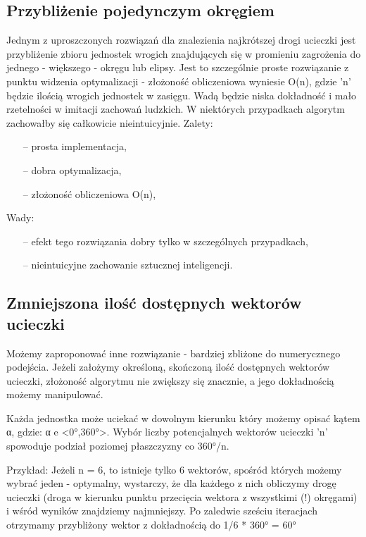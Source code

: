 \documentclass[12pt]{report}
\begin{document}
\subsection{Przybliżenie pojedynczym okręgiem}
Jednym z uproszczonych rozwiązań dla znalezienia najkrótszej drogi ucieczki jest przybliżenie zbioru jednostek wrogich znajdujących się w promieniu zagrożenia do jednego - większego - okręgu lub elipsy. Jest to szczególnie proste rozwiązanie z punktu widzenia optymalizacji - złożoność obliczeniowa wyniesie O(n), gdzie 'n' będzie ilością wrogich jednostek w zasięgu. Wadą będzie niska dokładność i mało rzetelności w imitacji zachowań ludzkich. W niektórych przypadkach algorytm zachowałby się całkowicie nieintuicyjnie.
Zalety:
\begin{itemize}
\item[--] prosta implementacja,
\item[--] dobra optymalizacja,
\item[--] złożoność obliczeniowa O(n),
\end{itemize}
Wady:
\begin{itemize}
\item[--] efekt tego rozwiązania dobry tylko w szczególnych przypadkach,
\item[--] nieintuicyjne zachowanie sztucznej inteligencji.
\end{itemize}

\subsection{Zmniejszona ilość dostępnych wektorów ucieczki}
Możemy zaproponować inne rozwiązanie - bardziej zbliżone do numerycznego podejścia. Jeżeli założymy określoną, skończoną ilość dostępnych wektorów ucieczki, złożoność algorytmu nie zwiększy się znacznie, a jego dokładnością możemy manipulować. 

Każda jednostka może uciekać w dowolnym kierunku który możemy opisać kątem α, gdzie:
α e <0°,360°>.
Wybór liczby potencjalnych wektorów ucieczki 'n' spowoduje podział poziomej płaszczyzny co 360°/n.

Przykład:
Jeżeli n = 6, to istnieje tylko 6 wektorów, spośród których możemy wybrać jeden - optymalny, wystarczy, że dla każdego z nich obliczymy drogę ucieczki (droga w kierunku punktu przecięcia wektora z wszystkimi (!) okręgami) i wśród wyników znajdziemy najmniejszy. Po zaledwie sześciu iteracjach otrzymamy przybliżony wektor z dokładnością do 1/6 * 360° = 60°
\end{document}
